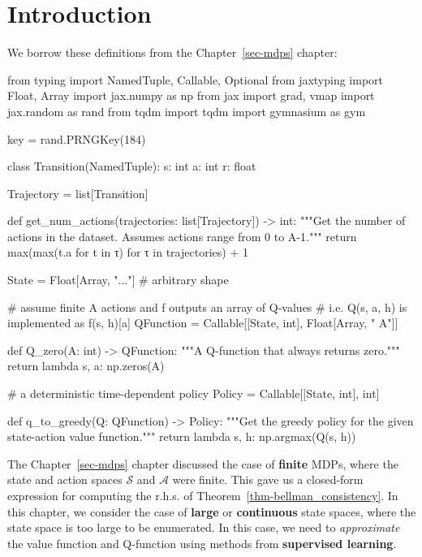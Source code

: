 \documentclass[
  letterpaper,
  DIV=11,
  numbers=noendperiod]{scrreprt}
\newenvironment{Shaded}{\begin{snugshade}}{\end{snugshade}}
\newcommand{\NormalTok}[1]{\textcolor[rgb]{0.00,0.23,0.31}{#1}}
\theoremstyle{plain}
\theoremstyle{plain}
\theoremstyle{definition}
\theoremstyle{definition}
\theoremstyle{remark}
\begin{document}
\section{Introduction}\label{introduction-5}

We borrow these definitions from the Chapter~\ref{sec-mdps} chapter:

\begin{Shaded}
\begin{Highlighting}[]

\NormalTok{from typing import NamedTuple, Callable, Optional}
\NormalTok{from jaxtyping import Float, Array}
\NormalTok{import jax.numpy as np}
\NormalTok{from jax import grad, vmap}
\NormalTok{import jax.random as rand}
\NormalTok{from tqdm import tqdm}
\NormalTok{import gymnasium as gym}

\NormalTok{key = rand.PRNGKey(184)}


\NormalTok{class Transition(NamedTuple):}
\NormalTok{    s: int}
\NormalTok{    a: int}
\NormalTok{    r: float}


\NormalTok{Trajectory = list[Transition]}


\NormalTok{def get\_num\_actions(trajectories: list[Trajectory]) {-}\textgreater{} int:}
\NormalTok{    """Get the number of actions in the dataset. Assumes actions range from 0 to A{-}1."""}
\NormalTok{    return max(max(t.a for t in τ) for τ in trajectories) + 1}


\NormalTok{State = Float[Array, "..."]  \# arbitrary shape}

\NormalTok{\# assume finite \textasciigrave{}A\textasciigrave{} actions and f outputs an array of Q{-}values}
\NormalTok{\# i.e. Q(s, a, h) is implemented as f(s, h)[a]}
\NormalTok{QFunction = Callable[[State, int], Float[Array, " A"]]}


\NormalTok{def Q\_zero(A: int) {-}\textgreater{} QFunction:}
\NormalTok{    """A Q{-}function that always returns zero."""}
\NormalTok{    return lambda s, a: np.zeros(A)}


\NormalTok{\# a deterministic time{-}dependent policy}
\NormalTok{Policy = Callable[[State, int], int]}


\NormalTok{def q\_to\_greedy(Q: QFunction) {-}\textgreater{} Policy:}
\NormalTok{    """Get the greedy policy for the given state{-}action value function."""}
\NormalTok{    return lambda s, h: np.argmax(Q(s, h))}
\end{Highlighting}
\end{Shaded}

The Chapter~\ref{sec-mdps} chapter discussed the case of \textbf{finite}
MDPs, where the state and action spaces \(\mathcal{S}\) and
\(\mathcal{A}\) were finite. This gave us a closed-form expression for
computing the r.h.s. of Theorem~\ref{thm-bellman_consistency}. In this
chapter, we consider the case of \textbf{large} or \textbf{continuous}
state spaces, where the state space is too large to be enumerated. In
this case, we need to \emph{approximate} the value function and
Q-function using methods from \textbf{supervised learning}.
\end{document}
